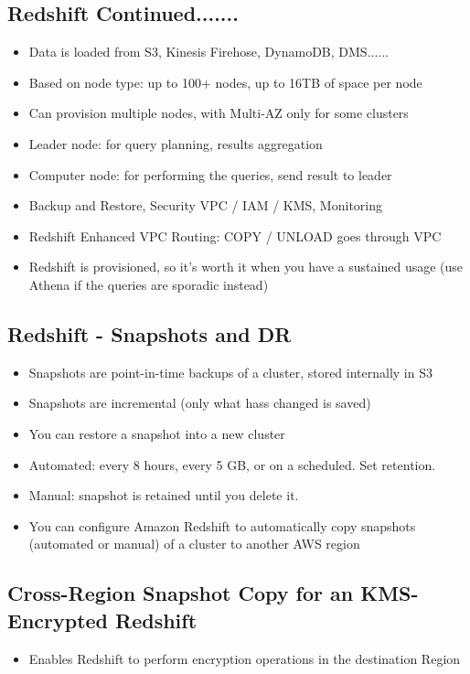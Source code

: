 \subsection{Redshift Continued.......}
\begin{itemize}
    \item Data is loaded from S3, Kinesis Firehose, DynamoDB, DMS......
    \item Based on node type: up to 100+ nodes, up to 16TB of space per node
    \item Can provision multiple nodes, with Multi-AZ only for some clusters
    \item Leader node: for query planning, results aggregation
    \item Computer node: for performing the queries, send result to leader
    \item Backup and Restore, Security VPC / IAM / KMS, Monitoring
    \item Redshift Enhanced VPC Routing: COPY / UNLOAD goes through VPC
    \item Redshift is provisioned, so it's worth it when you have a sustained usage (use Athena if the queries are sporadic instead)
\end{itemize}

\subsection{Redshift - Snapshots and DR}
\begin{itemize}
    \item Snapshots are point-in-time backups of a cluster, stored internally in S3
    \item Snapshots are incremental (only what hass changed is saved)
    \item You can restore a snapshot into a new cluster
    \item Automated: every 8 hours, every 5 GB, or on a scheduled. Set retention.
    \item Manual: snapshot is retained until you delete it.
    \item You can configure Amazon Redshift to automatically copy snapshots (automated or manual) of a cluster to another AWS region
\end{itemize}

\subsection{Cross-Region Snapshot Copy for an KMS-Encrypted Redshift}
\begin{itemize}
    \item Enables Redshift to perform encryption operations in the destination Region
\end{itemize}

